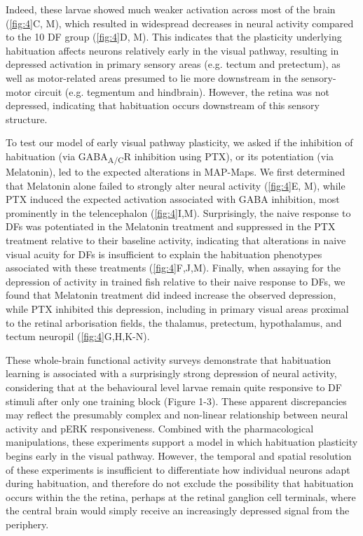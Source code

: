 \documentclass[9pt,lineno]{RandlettLab_elife}
\begin{document}
Indeed, these larvae showed much weaker activation across most of the brain (\autoref{fig:4}C, M), which resulted in widespread decreases in neural activity compared to the 10 DF group (\autoref{fig:4}D, M). This indicates that the plasticity underlying habituation affects neurons relatively early in the visual pathway, resulting in depressed activation in primary sensory areas (e.g. tectum and pretectum), as well as motor-related areas presumed to lie more downstream in the sensory-motor circuit (e.g. tegmentum and hindbrain). However, the retina was not depressed, indicating that habituation occurs downstream of this sensory structure. 

To test our model of early visual pathway plasticity, we asked if the inhibition of habituation (via GABA\textsubscript{A/C}R inhibition using PTX), or its potentiation (via Melatonin), led to the expected alterations in MAP-Maps. We first determined that Melatonin alone failed to strongly alter neural activity (\autoref{fig:4}E, M), while PTX induced the expected activation associated with GABA inhibition, most prominently in the telencephalon (\autoref{fig:4}I,M). Surprisingly, the naive response to DFs was potentiated in the Melatonin treatment and suppressed in the PTX treatment relative to their baseline activity, indicating that alterations in naive visual acuity for DFs is insufficient to explain the habituation phenotypes associated with these treatments (\autoref{fig:4}F,J,M). Finally, when assaying for the depression of activity in trained fish relative to their naive response to DFs, we found that Melatonin treatment did indeed increase the observed depression, while PTX inhibited this depression, including in primary visual areas proximal to the retinal arborisation fields, the thalamus, pretectum, hypothalamus, and tectum neuropil (\autoref{fig:4}G,H,K-N). 

These whole-brain functional activity surveys demonstrate that habituation learning is associated with a surprisingly strong depression of neural activity, considering that at the behavioural level larvae remain quite responsive to DF stimuli after only one training block (Figure 1-3). These apparent discrepancies may reflect the presumably complex and non-linear relationship between neural activity and pERK responsiveness. Combined with the pharmacological manipulations, these experiments support a model in which habituation plasticity begins early in the visual pathway. However, the temporal and spatial resolution of these experiments is insufficient to differentiate how individual neurons adapt during habituation, and therefore do not exclude the possibility that habituation occurs within the the retina, perhaps at the retinal ganglion cell terminals, where the central brain would simply receive an increasingly depressed signal from the periphery. 
\end{document}

